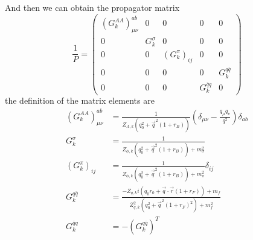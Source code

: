\documentclass[UTF8]{article}
\begin{document}
And then we can obtain the propagator matrix
\begin{equation}
\frac{1}{P}=
\begin{pmatrix}
(G^{AA}_{k})^{ab}_{\mu\nu} & 0 & 0 & 0 & 0 \\
0 & G^{\sigma}_{k} & 0 & 0 & 0\\
0 & 0 & (G^{\pi}_{k})_{ij} & 0 & 0\\
0 & 0 & 0 & 0 & G^{q\overline{q}}_{k}\\
0 & 0 & 0 & G^{\overline{q}q}_{k} & 0
\end{pmatrix}
\end{equation}
the definition of the matrix elements are
\begin{equation}
\begin{split}
(G^{AA}_{k})^{ab}_{\mu\nu}&=\frac{1}{Z_{A,k}(q_0^2+\vec{q}^2(1+r_B))}(\delta_{\mu\nu}-\frac{q_\mu q_\nu}{q^2})\delta_{ab}\\
G^{\sigma}_{k}&=\frac{1}{Z_{\phi,k}(q_0^2+\vec{q}^2(1+r_B))+m_{\sigma}^{2}}\\
(G^{\pi}_{k})_{ij}&=\frac{1}{Z_{\phi,k}(q_0^2+\vec{q}^2(1+r_B))+m_{\pi}^{2}}\delta_{ij}\\
G^{q\overline{q}}_{k}&=\frac{-Z_{q,k}i(q_0r_0+\vec{q}\cdot\vec{r}(1+r_F))+m_f}{Z_{q,k}^{2}(q_0^2+\vec{q}^2(1+r_F)^2)+m_f^2}\\
G^{\overline{q}q}_{k}&=-(G^{q\overline{q}}_{k})^T
\end{split}
\end{equation}
\end{document}
